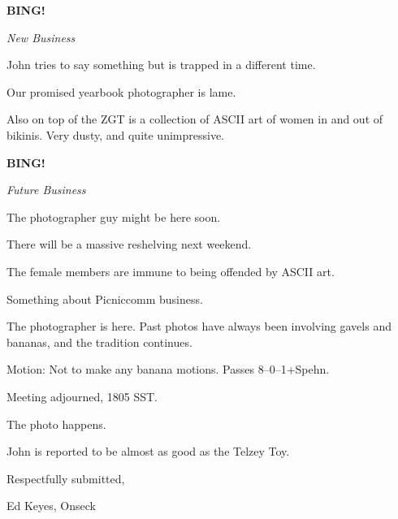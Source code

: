 \documentclass[12pt]{article}
\newcommand{\bing}{{\bf BING!} }
\newcommand{\goto}[1]{\bing \vskip 12pt \centerline{{\em{#1}}}}
\begin{document}
\goto{New Business}

John tries to say something but is trapped in a different time.

Our promised yearbook photographer is lame.

Also on top of the ZGT is a collection of ASCII art of women in and
out of bikinis.  Very dusty, and quite unimpressive.

\goto{Future Business}

The photographer guy might be here soon.

There will be a massive reshelving next weekend.

The female members are immune to being offended by ASCII art.

Something about Picniccomm business.

The photographer is here.  Past photos have always been involving
gavels and bananas, and the tradition continues.

Motion: Not to make any banana motions.  Passes 8--0--1+Spehn.

\vspace{12pt}

\noindent
Meeting adjourned, 1805 SST.

The photo happens.

John is reported to be almost as good as the Telzey Toy.

\vspace{18pt}

\centerline{Respectfully submitted,}
\centerline{Ed Keyes, Onseck}
\end{document}
